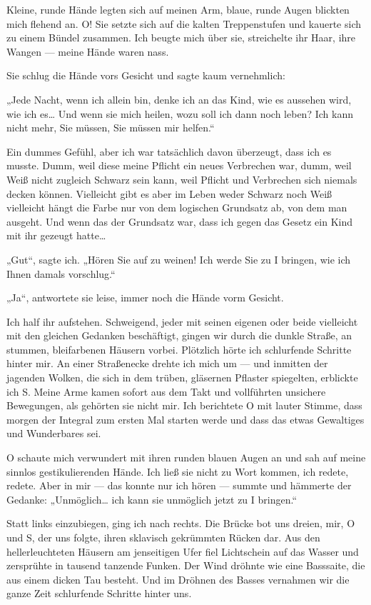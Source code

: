 Kleine, runde Hände legten sich auf meinen Arm, blaue, runde Augen
blickten mich flehend an. O! Sie setzte sich auf die kalten
Treppenstufen und kauerte sich zu einem Bündel zusammen. Ich beugte
mich über sie, streichelte ihr Haar, ihre Wangen — meine Hände
waren nass.

Sie schlug die Hände vors Gesicht und sagte kaum vernehmlich:

„Jede Nacht, wenn ich allein bin, denke ich an das Kind, wie es
aussehen wird, wie ich es\ldots{} Und wenn sie mich heilen, wozu soll
ich dann noch leben? Ich kann nicht mehr, Sie müssen, Sie müssen
mir helfen.“

Ein dummes Gefühl, aber ich war tatsächlich davon
überzeugt, dass ich es musste. Dumm, weil diese meine Pflicht ein
neues Verbrechen war, dumm, weil Weiß nicht zugleich Schwarz sein
kann, weil Pflicht und Verbrechen sich niemals decken können.
Vielleicht gibt es aber im Leben weder Schwarz noch Weiß vielleicht
hängt die Farbe nur von dem logischen Grundsatz ab, von dem man
ausgeht. Und wenn das der Grundsatz war, dass ich gegen das Gesetz
ein Kind mit ihr gezeugt hatte\ldots{}

„Gut“, sagte ich. „Hören Sie auf
zu weinen! Ich werde Sie zu I bringen, wie ich Ihnen damals
vorschlug.“

„Ja“, antwortete sie leise, immer noch die Hände vorm Gesicht.

Ich half ihr aufstehen. Schweigend, jeder mit seinen eigenen oder
beide vielleicht mit den gleichen Gedanken beschäftigt, gingen wir
durch die dunkle Straße, an stummen, bleifarbenen Häusern vorbei.
Plötzlich hörte ich schlurfende Schritte hinter mir. An einer
Straßenecke drehte ich mich um — und inmitten der jagenden Wolken,
die sich in dem trüben, gläsernen Pflaster spiegelten, erblickte
ich S. Meine Arme kamen sofort aus dem Takt und vollführten
unsichere Bewegungen, als gehörten sie nicht mir. Ich berichtete O
mit lauter Stimme, dass morgen der Integral zum ersten Mal starten
werde und dass das etwas Gewaltiges und Wunderbares sei.

O schaute
mich verwundert mit ihren runden blauen Augen an und sah auf meine
sinnlos gestikulierenden Hände. Ich ließ sie nicht zu Wort kommen,
ich redete, redete. Aber in mir — das konnte nur ich hören —
summte und hämmerte der Gedanke: „Unmöglich\ldots{} ich kann sie
unmöglich jetzt zu I bringen.“

Statt links einzubiegen, ging ich
nach rechts. Die Brücke bot uns dreien, mir, O und S, der uns
folgte, ihren sklavisch gekrümmten Rücken dar. Aus den
hellerleuchteten Häusern am jenseitigen Ufer fiel Lichtschein auf
das Wasser und zersprühte in tausend tanzende Funken. Der Wind
dröhnte wie eine Basssaite, die aus einem dicken Tau besteht. Und
im Dröhnen des Basses vernahmen wir die ganze Zeit schlurfende
Schritte hinter uns.

